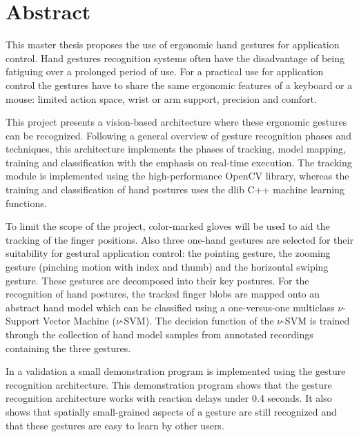 \section*{Abstract}
This master thesis proposes the use of ergonomic hand gestures for application control. Hand gestures recognition systems often have the disadvantage of being fatiguing over a prolonged period of use. For a practical use for application control the gestures have to share the same ergonomic features of a keyboard or a mouse: limited action space, wrist or arm support, precision and comfort.

This project presents a vision-based architecture where these ergonomic gestures can be recognized. 
Following a general overview of gesture recognition phases and techniques, this architecture implements the phases of tracking, model mapping, training and classification with the emphasis on real-time execution. The tracking module is implemented using the high-performance OpenCV library, whereas the training and classification of hand postures uses the dlib C++ machine learning functions.  

To limit the scope of the project, color-marked gloves will be used to aid the tracking of the finger positions. Also three one-hand gestures are selected for their suitability for gestural application control: the pointing gesture, the zooming gesture (pinching motion with index and thumb) and the horizontal swiping gesture. These gestures are decomposed into their key postures. For the recognition of hand postures, the tracked finger blobs are mapped onto an abstract hand model which can be classified using a one-versus-one multiclass $\nu$-Support Vector Machine ($\nu$-SVM). The decision function of the $\nu$-SVM is trained through the collection of hand model samples from annotated recordings containing the three gestures.

In a validation a small demonstration program is implemented using the gesture recognition architecture. This demonstration program shows that the gesture recognition architecture works with reaction delays under 0.4 seconds. It also shows that spatially small-grained aspects of a gesture are still recognized and that these gestures are easy to learn by other users.